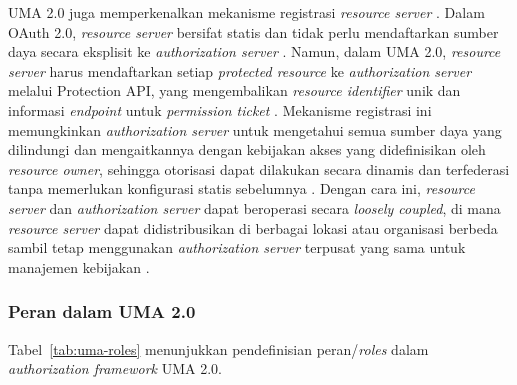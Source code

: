 UMA 2.0 juga memperkenalkan mekanisme registrasi \textit{resource server} \autocite{umaspec}.
Dalam OAuth 2.0, \textit{resource server} bersifat statis dan tidak perlu mendaftarkan sumber daya secara eksplisit ke \textit{authorization server} \autocite{oauthspec}.
Namun, dalam UMA 2.0, \textit{resource server} harus mendaftarkan setiap \textit{protected resource} ke \textit{authorization server} melalui Protection API, yang mengembalikan \textit{resource identifier} unik dan informasi \textit{endpoint} untuk \textit{permission ticket} \autocite{umaspec}.
Mekanisme registrasi ini memungkinkan \textit{authorization server} untuk mengetahui semua sumber daya yang dilindungi dan mengaitkannya dengan kebijakan akses yang didefinisikan oleh \textit{resource owner}, sehingga otorisasi dapat dilakukan secara dinamis dan terfederasi tanpa memerlukan konfigurasi statis sebelumnya \autocite{umafederatedspec}.
Dengan cara ini, \textit{resource server} dan \textit{authorization server} dapat beroperasi secara \textit{loosely coupled}, di mana \textit{resource server} dapat didistribusikan di berbagai lokasi atau organisasi berbeda sambil tetap menggunakan \textit{authorization server} terpusat yang sama untuk manajemen kebijakan \autocite{umaspec}.


\subsubsection{Peran dalam UMA 2.0}

Tabel~\ref{tab:uma-roles} menunjukkan pendefinisian peran/\textit{roles} dalam \textit{authorization framework} UMA 2.0.


